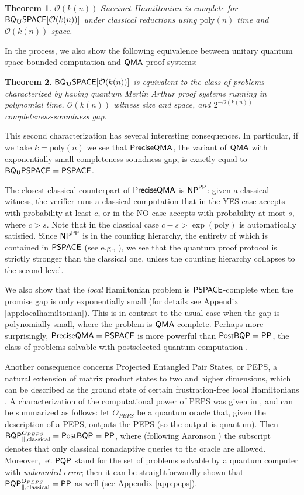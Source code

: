 \documentclass[11pt]{article}
\newtheorem{theorem}{Theorem}
\theoremstyle{definition}
\theoremstyle{remark}
\theoremstyle{definition}
\newcommand\QMA{{\sf{QMA}}}
\newcommand\PSPACE{{\sf{PSPACE}}}
\newcommand\BQPSPACE{{\sf{BQ_{U}PSPACE}}}
\newcommand\PP{\sf{PP}}
\newcommand\NP{{\sf{NP}}}
\newcommand\BQP{{\sf{BQP}}}
\newcommand\PostBQP{{\sf{PostBQP}}}
\newcommand\PQP{{\sf{PQP}}}
\newcommand\QMAexp{{\sf{PreciseQMA}}}
\newcommand\spechamiltonian[1]{#1\textit{-Succinct Hamiltonian}}
\newcommand{\classfont}{\sf}
\newcommand{\Unitary}{\mathbf{U}}
\newcommand{\unitaryBQSPACE}[1]{{\classfont{BQ}_\Unitary\classfont{SPACE}}[#1]}
\newcommand{\poly}{\textrm{poly}}
\begin{document}
\begin{theorem}
$\spechamiltonian{\mathcal{O}(k(n))}$ is complete for $\unitaryBQSPACE{\mathcal{O}(k(n))}$ under classical reductions using $\poly(n)$ time and $\mathcal{O}(k(n))$ space.
\end{theorem}

In the process, we also show the following equivalence between unitary quantum space-bounded computation and $\QMA$-proof systems:
\begin{theorem}
$\unitaryBQSPACE{\mathcal{O}(k(n))}$ is equivalent to the class of problems characterized by having quantum Merlin Arthur proof systems running in polynomial time, $\mathcal{O}(k(n))$ witness size and space, and $2^{-\mathcal{O}(k(n))}$ completeness-soundness gap.
\end{theorem}

This second characterization has several interesting consequences.  In particular, if we take $k = \poly(n)$ we see that $\QMAexp$, the variant of $\QMA$ with exponentially small completeness-soundness gap, is exactly equal to $\BQPSPACE=\PSPACE$.  

The closest classical counterpart of $\QMAexp$ is $\NP^{\PP}$: given a classical witness, the verifier runs a classical computation that in the YES case accepts with probability at least $c$, or in the NO case accepts with probability at most $s$, where $c>s$. Note that in the classical case $c - s > \exp(\poly)$ is automatically satisfied. Since $\NP^{\PP}$ is in the counting hierarchy, the entirety of which is contained in $\PSPACE$ (see e.g., \cite{allenderwagner}), we see that the quantum proof protocol is strictly stronger than the classical one, unless the counting hierarchy collapses to the second level.

We also show that the \emph{local} Hamiltonian problem is $\PSPACE$-complete when the promise gap is only exponentially small (for details see Appendix \ref{app:localhamiltonian}). This is in contrast to the usual case when the gap is polynomially small, where the problem is $\QMA$-complete. Perhaps more surprisingly, $\QMAexp = \PSPACE$ is more powerful than $\PostBQP=\PP$, the class of problems solvable with postselected quantum computation \cite{aaronson05}.

Another consequence concerns Projected Entangled Pair States, or PEPS, a natural extension of matrix product states to two and higher dimensions, which can be described as the ground state of certain frustration-free local Hamiltonians \cite{vc04}. A characterization of the computational power of PEPS was given in \cite{swv07}, and can be summarized as follows: let $O_{PEPS}$ be a quantum oracle that, given the description of a PEPS, outputs the PEPS (so the output is quantum). Then $\BQP^{O_{PEPS}}_{\parallel,\text{classical}} = \PostBQP = \PP$, where (following Aaronson \cite{aaronson05}) the subscript  denotes that only classical nonadaptive queries to the oracle are allowed. Moreover, let $\PQP$ stand for the set of problems solvable by a quantum computer with \emph{unbounded error}; then it can be straightforwardly shown that $\PQP^{O_{PEPS}}_{\parallel,\text{classical}} = \PP$ as well (see Appendix \ref{app:peps}).
\end{document}
